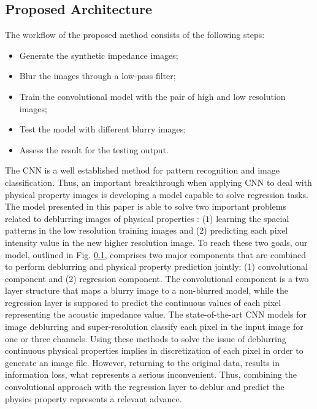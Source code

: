 \documentclass[conference,compsoc]{IEEEtran}
\begin{document}
\subsection{Proposed Architecture}
The workflow of the proposed method consists of the following
steps:
\begin{itemize}
 \item Generate the synthetic impedance images;
 \item Blur the images through a low-pass filter;
 \item Train the convolutional model with the pair of high and low resolution images;
 \item Test the model with different blurry images;
 \item Assess the result for the testing output.
\end{itemize}

The CNN is a well established method for
pattern recognition and image classification.
Thus, an important breakthrough when applying CNN to
deal with physical property images is developing a model
capable to solve regression tasks. The model presented in this paper
is able to solve two important problems related to deblurring  images of physical properties
: ($1$) learning the spacial patterns in the low resolution
training images and ($2$) predicting each pixel intensity value in the new
higher resolution image.
To reach these two goals, our model, outlined in Fig. \ref{}, comprises two major
components that are combined to perform deblurring and physical property prediction
jointly: (1) convolutional component and (2) regression component. The convolutional component
is a two layer structure that maps a blurry image to a non-blurred model, while 
the regression layer is supposed to predict the continuous values of each pixel
representing the acoustic impedance value. 
The state-of-the-art CNN models for image deblurring \cite{Grigorios2017} and super-resolution \cite{Dahl2017}
classify each pixel in the input image for one or three channels. 
Using these methods to solve the issue of deblurring continuous physical properties 
implies in discretization of each pixel in order to generate an image file. However, returning
to the original data, results in information loss, what represents a serious inconvenient.
Thus, combining the convolutional approach with the regression layer to deblur and predict
the physics property represents a relevant advance.
\end{document}
